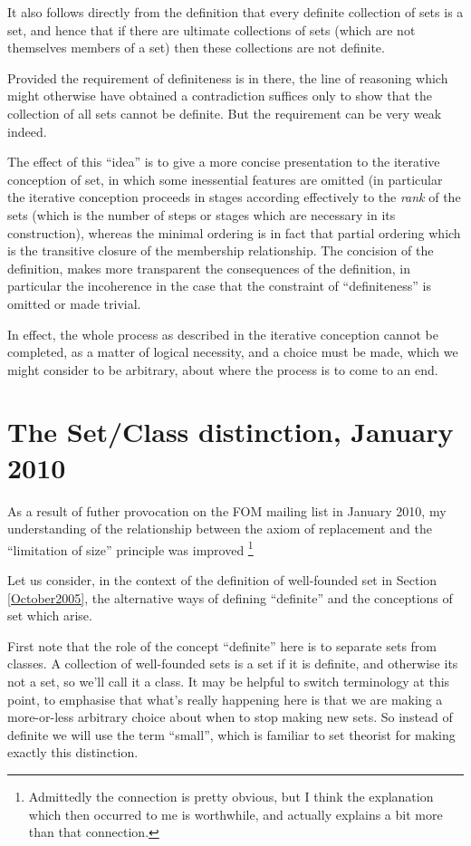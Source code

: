 \documentclass[10pt,titlepage]{book}
\begin{document}
It also follows directly from the definition that every definite collection of sets is a set, and hence that if there are ultimate collections of sets (which are not themselves members of a set) then these collections are not definite.

Provided the requirement of definiteness is in there, the line of reasoning which might otherwise have obtained a contradiction suffices only to show that the collection of all sets cannot be definite.
But the requirement can be very weak indeed.

The effect of this ``idea'' is to give a more concise presentation to the iterative conception of set, in which some inessential features are omitted (in particular the iterative conception proceeds in stages according effectively to the {\it rank} of the sets (which is the number of steps or stages which are necessary in its construction), whereas the minimal ordering is in fact that partial ordering which is the transitive closure of the membership relationship.
The concision of the definition, makes more transparent the consequences of the definition, in particular the incoherence in the case that the constraint of ``definiteness'' is omitted or made trivial.

In effect, the whole process as described in the iterative conception cannot be completed, as a matter of logical necessity, and a choice must be made, which we might consider to be arbitrary, about where the process is to come to an end.

\section{The Set/Class distinction, January 2010}

As a result of futher provocation on the FOM mailing list in January 2010, my understanding of the relationship between the axiom of replacement and the ``limitation of size'' principle was improved
\footnote{Admittedly the connection is pretty obvious, but I think the explanation which then occurred to me is worthwhile, and actually explains a bit more than that connection.}%

Let us consider, in the context of the definition of well-founded set in Section \ref{October2005}, the alternative ways of defining ``definite'' and the conceptions of set which arise.

First note that the role of the concept ``definite'' here is to separate sets from classes.
A collection of well-founded sets is a set if it is definite, and otherwise its not a set, so we'll call it a class.
It may be helpful to switch terminology at this point, to emphasise that what's really happening here is that we are making a more-or-less arbitrary choice about when to stop making new sets.
So instead of definite we will use the term ``small'', which is familiar to set theorist for making exactly this distinction.
\end{document}
